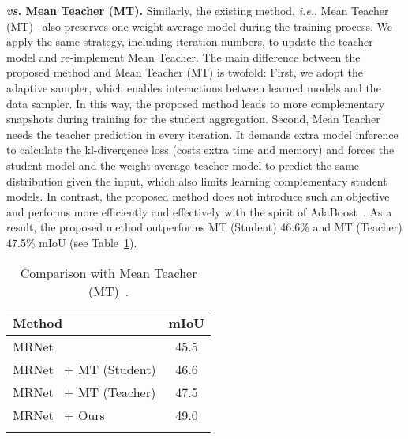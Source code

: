 \documentclass[journal]{IEEEtran}
\def\ie{\emph{i.e.}}
\begin{document}
\noindent\textbf{\emph{vs.} Mean Teacher (MT).} 
Similarly, the existing method, \ie, Mean Teacher (MT)~\cite{tarvainen2017mean} also preserves one weight-average model during the training process.  We apply the same strategy, including iteration numbers, to update the teacher model and re-implement  Mean Teacher. The main difference between the proposed method and Mean Teacher (MT) is twofold: First, we adopt the adaptive sampler, which enables interactions between learned models and the data sampler. In this way, the proposed method leads to more complementary snapshots during training for the student aggregation. Second, Mean Teacher needs the teacher prediction in every iteration. It demands extra model inference to calculate the kl-divergence loss (costs extra time and memory) and forces the student model and the weight-average teacher model to predict the same distribution given the input, which also limits learning complementary student models. In contrast, the proposed method does not introduce such an objective and performs more efficiently and effectively with the spirit of AdaBoost~\cite{freund1996experiments}. As a result, the proposed method outperforms MT (Student) 46.6\% and MT (Teacher) 47.5\% mIoU (see Table~\ref{table:meanteacher}). 

\setlength{\tabcolsep}{20pt}
\begin{table}[tb]
	\caption{
		Comparison with Mean Teacher (MT)~\cite{tarvainen2017mean}. 
	}\vspace{-.1in}
\label{table:meanteacher}
\footnotesize
	\centering
	\begin{tabular}{l|c}
		\shline
		Method & mIoU \\
		\hline
		MRNet~\cite{zheng2019unsupervised} & 45.5 \\
		\hline
		MRNet~\cite{zheng2019unsupervised} + MT (Student)& 46.6 \\
		MRNet~\cite{zheng2019unsupervised} + MT (Teacher)& 47.5  \\
		MRNet~\cite{zheng2019unsupervised} + Ours & 49.0 \\
		\shline
	\end{tabular}
\end{table}
\end{document}
